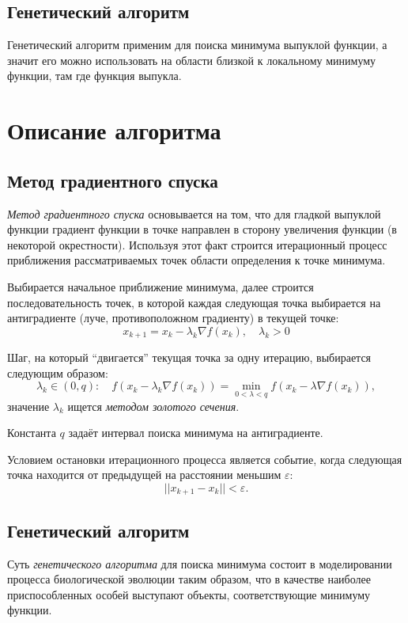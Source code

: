 \documentclass[10pt,a4paper,titlepage]{article}
\begin{document}
\subsection{Генетический алгоритм}
Генетический алгоритм применим для поиска минимума выпуклой функции, 
а значит его можно использовать на области близкой к локальному минимуму функции, 
там где функция выпукла.

\section{Описание алгоритма}
\subsection{Метод градиентного спуска}

\textit{Метод градиентного спуска} основывается на том, что для гладкой выпуклой функции градиент функции в точке направлен
в сторону увеличения функции (в некоторой окрестности).
Используя этот факт строится итерационный процесс приближения рассматриваемых точек области определения 
к точке минимума.

Выбирается начальное приближение минимума, далее строится последовательность точек,
в которой каждая следующая точка выбирается на антиградиенте (луче, противоположном градиенту) в текущей точке:
$$ x_{k+1} = x_k - \lambda_k \nabla f(x_k), \quad \lambda_k > 0 $$

Шаг, на который ``двигается'' текущая точка за одну итерацию, выбирается следующим образом:
$$
  \lambda_k \in (0, q)\!: 
    \quad f(x_k - \lambda_k \nabla f(x_k)) = \min\limits_{0 < \lambda < q} f(x_k - \lambda \nabla f(x_k)),
$$
значение $\lambda_k$ ищется \textit{методом золотого сечения}.

Константа $q$ задаёт интервал поиска минимума на антиградиенте.

Условием остановки итерационного процесса является событие, когда следующая точка находится от предыдущей 
на расстоянии меньшим $\varepsilon$:
$$ || x_{k+1} - x_k || < \varepsilon. $$ %


\subsection{Генетический алгоритм}
Суть \textit{генетического алгоритма} для поиска минимума состоит в моделировании процесса биологической эволюции таким образом, 
что в качестве наиболее приспособленных особей выступают объекты, соответствующие минимуму функции.
\end{document}
